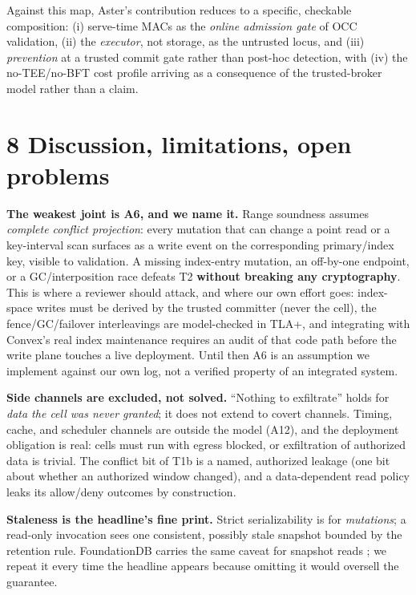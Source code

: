 \documentclass[
  11pt,
]{article}
\begin{document}
Against this map, Aster's contribution reduces to a specific, checkable composition: (i) serve-time MACs as the \emph{online admission gate} of OCC validation, (ii) the \emph{executor}, not storage, as the untrusted locus, and (iii) \emph{prevention} at a trusted commit gate rather than post-hoc detection, with (iv) the no-TEE/no-BFT cost profile arriving as a consequence of the trusted-broker model rather than a claim.

\section{8 Discussion, limitations, open problems}\label{discussion-limitations-open-problems}

\textbf{The weakest joint is A6, and we name it.} Range soundness assumes \emph{complete conflict projection}: every mutation that can change a point read or a key-interval scan surfaces as a write event on the corresponding primary/index key, visible to validation. A missing index-entry mutation, an off-by-one endpoint, or a GC/interposition race defeats T2 \textbf{without breaking any cryptography}. This is where a reviewer should attack, and where our own effort goes: index-space writes must be derived by the trusted committer (never the cell), the fence/GC/failover interleavings are model-checked in TLA+, and integrating with Convex's real index maintenance requires an audit of that code path before the write plane touches a live deployment. Until then A6 is an assumption we implement against our own log, not a verified property of an integrated system.

\textbf{Side channels are excluded, not solved.} ``Nothing to exfiltrate'' holds for \emph{data the cell was never granted}; it does not extend to covert channels. Timing, cache, and scheduler channels are outside the model (A12), and the deployment obligation is real: cells must run with egress blocked, or exfiltration of authorized data is trivial. The conflict bit of T1b is a named, authorized leakage (one bit about whether an authorized window changed), and a data-dependent read policy leaks its allow/deny outcomes by construction.

\textbf{Staleness is the headline's fine print.} Strict serializability is for \emph{mutations}; a read-only invocation sees one consistent, possibly stale snapshot bounded by the retention rule. FoundationDB carries the same caveat for snapshot reads \cite{fdb2021}; we repeat it every time the headline appears because omitting it would oversell the guarantee.
\end{document}
